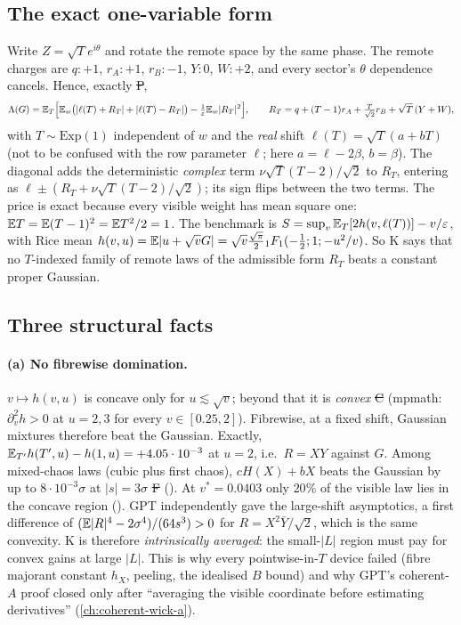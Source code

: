 \subsection{The exact one-variable form}\label{sec:forest-T}
Write $Z=\sqrt T e^{i\theta}$ and rotate the remote space by the same phase. The remote charges are $q:+1$, $r_A:+1$, $r_B:-1$, $Y:0$, $W:+2$, and every sector's $\theta$ dependence
cancels. Hence, exactly \st{P},
\[
\Lambda(G)=\mathbb E_T\Bigl[\mathbb E_w\bigl(|\ell(T)+R_T|+|\ell(T)-R_T|\bigr)-\tfrac1\varepsilon\mathbb E_w|R_T|^2\Bigr],\qquad
R_T=q+(T-1)r_A+\tfrac T{\sqrt2}r_B+\sqrt T\,(Y+W),
\]
with $T\sim\mathrm{Exp}(1)$ independent of $w$ and the \emph{real} shift $\ell(T)=\sqrt T(a+bT)$ (not to be confused with the row parameter $\ell$; here $a=\ell-2\beta$, $b=\beta$). The diagonal adds the deterministic \emph{complex}
term $\nu\sqrt T(T-2)/\sqrt2$ to $R_T$, entering as $\ell\pm(R_T+\nu\sqrt T(T-2)/\sqrt2)$; its sign flips between the two terms. The price is exact
because every visible weight has mean square one: $\mathbb E T=\mathbb E(T-1)^2=\mathbb E T^2/2=1$. The benchmark is $S=\sup_v\mathbb E_T[2h(v,\ell(T))]-v/\varepsilon$, with Rice mean
$h(v,u)=\mathbb E|u+\sqrt vG|=\sqrt v\tfrac{\sqrt\pi}2{}_1F_1(-\tfrac12;1;-u^2/v)$. So K says that no $T$-indexed family of remote laws of the admissible form $R_T$ beats a constant proper
Gaussian.

\subsection{Three structural facts}
\paragraph{(a) No fibrewise domination.} $v\mapsto h(v,u)$ is concave only for $u\lesssim\sqrt v$; beyond that it is \emph{convex} \st{C} (mpmath: $\partial_v^2h>0$ at $u=2,3$ for every
$v\in[0.25,2]$). Fibrewise, at a fixed shift, Gaussian mixtures therefore beat the Gaussian. Exactly, $\mathbb E_{T'}h(T',u)-h(1,u)=+4.05\cdot10^{-3}$ at $u=2$, i.e.\ $R=XY$ against $G$. Among
mixed-chaos laws (cubic plus first chaos), $cH(X)+bX$ beats the Gaussian by up to $8\cdot10^{-3}\sigma$ at $|s|=3\sigma$ \st{F} (). At $v^*=0.0403$ only $20\%$ of the visible law lies in the concave
region (). GPT independently gave the large-shift asymptotics, a first difference of $(\mathbb E|R|^4-2\sigma^4)/(64s^3)>0$ for $R=X^2\bar Y/\sqrt2$, which is
the same convexity. K is therefore \emph{intrinsically averaged}: the small-$|L|$ region must pay for convex gains at large $|L|$. This is why every pointwise-in-$T$ device failed
(fibre majorant constant $h_X$, peeling, the idealised $B$ bound) and why GPT's coherent-$A$ proof closed only after ``averaging the visible coordinate before estimating derivatives''
(\autoref{ch:coherent-wick-a}).

